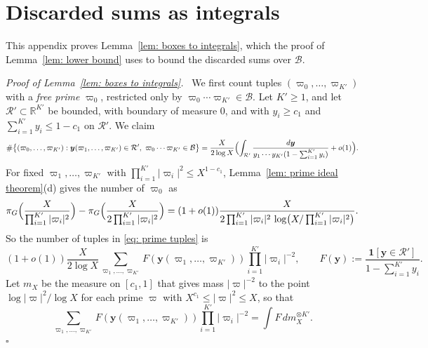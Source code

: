\documentclass{article}
\numberwithin{equation}{section}
\newenvironment{proof}[1][Proof]{\par\medskip\noindent\textit{#1.}\ }{\hfill$\square$\par\medskip}
\newcommand{\Le}{\leqslant}
\newcommand{\Ge}{\geqslant}
\begin{document}
\section{Discarded sums as integrals}
\label{app: integrals}

This appendix proves Lemma~\ref{lem: boxes to integrals}, which the proof of Lemma~\ref{lem: lower bound} uses to bound the discarded sums over $\mathcal{B}$.

\begin{proof}[Proof of Lemma~\ref{lem: boxes to integrals}]
We first count tuples $(\varpi_0, \dots, \varpi_{K'})$ with a \emph{free prime} $\varpi_0$, restricted only by $\varpi_0 \cdots \varpi_{K'} \in \mathcal{B}$. Let $K' \Ge 1$, and let $\mathcal{R}' \subset \mathbb{R}^{K'}$ be bounded, with boundary of measure $0$, and with $y_i \Ge c_1$ and $\sum_{i=1}^{K'} y_i \Le 1 - c_1$ on $\mathcal{R}'$. We claim
\begin{equation}
\label{eq: prime tuples}
\#\bigl\{ (\varpi_0, \dots, \varpi_{K'}) : \boldsymbol{y}(\varpi_1, \dots, \varpi_{K'}) \in \mathcal{R}',\ \varpi_0 \cdots \varpi_{K'} \in \mathcal{B} \bigr\} = \frac{X}{2\log X} \Bigl( \int_{\mathcal{R}'} \frac{d\boldsymbol{y}}{y_1 \cdots y_{K'} (1 - \sum_{i=1}^{K'} y_i)} + o(1) \Bigr).
\end{equation}
For fixed $\varpi_1, \dots, \varpi_{K'}$ with $\prod_{i=1}^{K'} |\varpi_i|^2 \Le X^{1 - c_1}$, Lemma~\ref{lem: prime ideal theorem}(d) gives the number of $\varpi_0$ as
\begin{equation*}
\pi_G\Bigl( \frac{X}{\prod_{i=1}^{K'} |\varpi_i|^2} \Bigr) - \pi_G\Bigl( \frac{X}{2\prod_{i=1}^{K'} |\varpi_i|^2} \Bigr) = (1 + o(1)) \frac{X}{2 \prod_{i=1}^{K'} |\varpi_i|^2\, \log\bigl(X/\prod_{i=1}^{K'} |\varpi_i|^2\bigr)}.
\end{equation*}
So the number of tuples in \eqref{eq: prime tuples} is
\begin{equation*}
(1 + o(1)) \frac{X}{2\log X} \sum_{\varpi_1, \dots, \varpi_{K'}} F(\boldsymbol{y}(\varpi_1, \dots, \varpi_{K'})) \prod_{i=1}^{K'} |\varpi_i|^{-2}, \qquad F(\boldsymbol{y}) := \frac{\mathbf{1}[\boldsymbol{y} \in \mathcal{R}']}{1 - \sum_{i=1}^{K'} y_i}.
\end{equation*}
Let $m_X$ be the measure on $[c_1, 1]$ that gives mass $|\varpi|^{-2}$ to the point $\log|\varpi|^2/\log X$ for each prime $\varpi$ with $X^{c_1} \Le |\varpi|^2 \Le X$, so that
\begin{equation*}
\sum_{\varpi_1, \dots, \varpi_{K'}} F(\boldsymbol{y}(\varpi_1, \dots, \varpi_{K'})) \prod_{i=1}^{K'} |\varpi_i|^{-2} = \int F\, dm_X^{\otimes K'}.

\end{equation*}
\end{proof}
\end{document}
